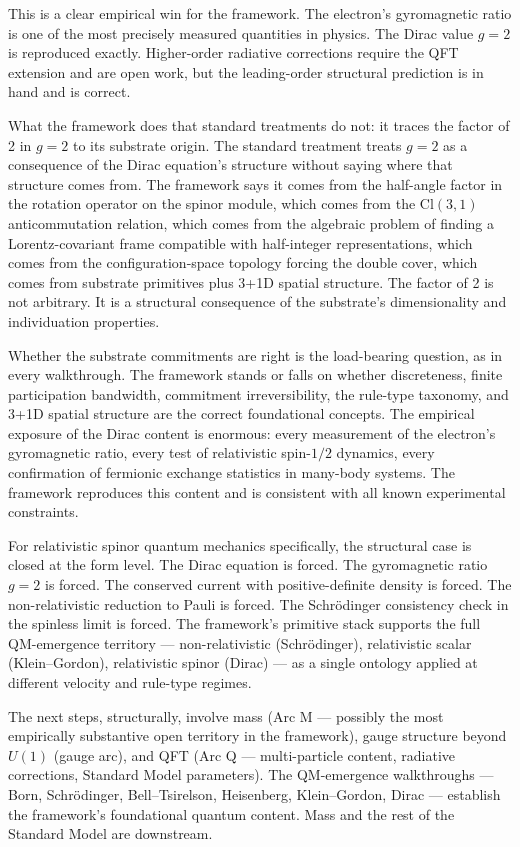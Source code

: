 \documentclass[11pt,a4paper]{article}
\begin{document}
This is a clear empirical win for the framework. The electron's gyromagnetic ratio is one of the most precisely measured quantities in physics. The Dirac value $g = 2$ is reproduced exactly. Higher-order radiative corrections require the QFT extension and are open work, but the leading-order structural prediction is in hand and is correct.

What the framework does that standard treatments do not: it traces the factor of 2 in $g = 2$ to its substrate origin. The standard treatment treats $g = 2$ as a consequence of the Dirac equation's structure without saying where that structure comes from. The framework says it comes from the half-angle factor in the rotation operator on the spinor module, which comes from the $\mathrm{Cl}(3,1)$ anticommutation relation, which comes from the algebraic problem of finding a Lorentz-covariant frame compatible with half-integer representations, which comes from the configuration-space topology forcing the double cover, which comes from substrate primitives plus 3+1D spatial structure. The factor of 2 is not arbitrary. It is a structural consequence of the substrate's dimensionality and individuation properties.

Whether the substrate commitments are right is the load-bearing question, as in every walkthrough. The framework stands or falls on whether discreteness, finite participation bandwidth, commitment irreversibility, the rule-type taxonomy, and 3+1D spatial structure are the correct foundational concepts. The empirical exposure of the Dirac content is enormous: every measurement of the electron's gyromagnetic ratio, every test of relativistic spin-$1/2$ dynamics, every confirmation of fermionic exchange statistics in many-body systems. The framework reproduces this content and is consistent with all known experimental constraints.

For relativistic spinor quantum mechanics specifically, the structural case is closed at the form level. The Dirac equation is forced. The gyromagnetic ratio $g = 2$ is forced. The conserved current with positive-definite density is forced. The non-relativistic reduction to Pauli is forced. The Schr\"odinger consistency check in the spinless limit is forced. The framework's primitive stack supports the full QM-emergence territory --- non-relativistic (Schr\"odinger), relativistic scalar (Klein--Gordon), relativistic spinor (Dirac) --- as a single ontology applied at different velocity and rule-type regimes.

The next steps, structurally, involve mass (Arc M --- possibly the most empirically substantive open territory in the framework), gauge structure beyond $U(1)$ (gauge arc), and QFT (Arc Q --- multi-particle content, radiative corrections, Standard Model parameters). The QM-emergence walkthroughs --- Born, Schr\"odinger, Bell--Tsirelson, Heisenberg, Klein--Gordon, Dirac --- establish the framework's foundational quantum content. Mass and the rest of the Standard Model are downstream.
\end{document}
